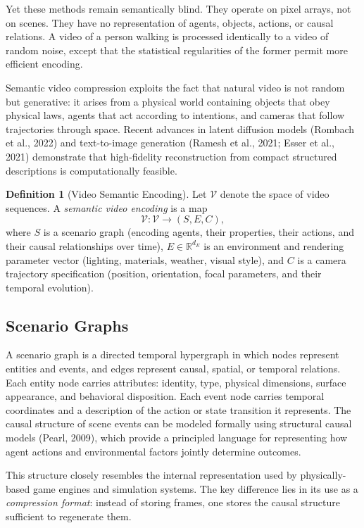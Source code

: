 \documentclass[11pt,a4paper]{article}
\theoremstyle{definition}
\newtheorem{definition}[theorem]{Definition}
\theoremstyle{remark}
\begin{document}
Yet these methods remain semantically blind. They operate on pixel arrays, not on scenes. They have no representation of agents, objects, actions, or causal relations. A video of a person walking is processed identically to a video of random noise, except that the statistical regularities of the former permit more efficient encoding.

Semantic video compression exploits the fact that natural video is not random but generative: it arises from a physical world containing objects that obey physical laws, agents that act according to intentions, and cameras that follow trajectories through space. Recent advances in latent diffusion models (Rombach et al., 2022) and text-to-image generation (Ramesh et al., 2021; Esser et al., 2021) demonstrate that high-fidelity reconstruction from compact structured descriptions is computationally feasible.

\begin{definition}[Video Semantic Encoding]
Let $\mathcal{V}$ denote the space of video sequences. A \emph{semantic video encoding} is a map
\[
\mathcal{V} : \mathcal{V} \rightarrow (S, E, C),
\]
where $S$ is a scenario graph (encoding agents, their properties, their actions, and their causal relationships over time), $E \in \mathbb{R}^{d_E}$ is an environment and rendering parameter vector (lighting, materials, weather, visual style), and $C$ is a camera trajectory specification (position, orientation, focal parameters, and their temporal evolution).
\end{definition}

\subsection{Scenario Graphs}

A scenario graph is a directed temporal hypergraph in which nodes represent entities and events, and edges represent causal, spatial, or temporal relations. Each entity node carries attributes: identity, type, physical dimensions, surface appearance, and behavioral disposition. Each event node carries temporal coordinates and a description of the action or state transition it represents. The causal structure of scene events can be modeled formally using structural causal models (Pearl, 2009), which provide a principled language for representing how agent actions and environmental factors jointly determine outcomes.

This structure closely resembles the internal representation used by physically-based game engines and simulation systems. The key difference lies in its use as a \emph{compression format}: instead of storing frames, one stores the causal structure sufficient to regenerate them.
\end{document}
